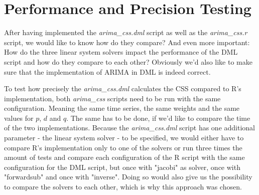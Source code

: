 \clearpage

\section{Performance and Precision Testing}\label{performance_precision_testing}

After having implemented the \textit{arima\_css.dml} script as well as the \textit{arima\_css.r} script, we would like to know how do they compare? And even more important: How do the three linear system solvers impact the performance of the \acs{DML} script and how do they compare to each other? Obviously we'd also like to make sure that the implementation of \acs{ARIMA} in \acs{DML} is indeed correct.

To test how precisely the \textit{arima\_css.dml} calculates the \acl{CSS} compared to R's implementation, both \textit{arima\_css} scripts need to be run with the same configuration. Meaning the same time series, the same weights and the same values for $p$, $d$ and $q$. The same has to be done, if we'd like to compare the time of the two implementations. Because the \textit{arima\_css.dml} script has one additional parameter - the linear system solver - to be specified, we would either have to compare R's implementation only to one of the solvers or run three times the amount of tests and compare each configuration of the R script with the same configuration for the \acs{DML} script, but once with "jacobi" as solver, once with "forwardsub" and once with "inverse". Doing so would also give us the possibility to compare the solvers to each other, which is why this approach was chosen.

